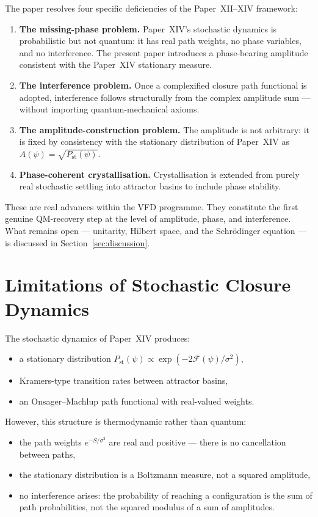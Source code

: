 \documentclass[12pt]{article}
\newcommand{\Fcal}{\mathcal{F}}
\begin{document}
The paper resolves four specific deficiencies of the Paper~XII--XIV framework:
\begin{enumerate}
    \item[(P1)] \textbf{The missing-phase problem.} Paper~XIV's stochastic dynamics is probabilistic but not quantum: it has real path weights, no phase variables, and no interference. The present paper introduces a phase-bearing amplitude consistent with the Paper~XIV stationary measure.
    \item[(P2)] \textbf{The interference problem.} Once a complexified closure path functional is adopted, interference follows structurally from the complex amplitude sum --- without importing quantum-mechanical axioms.
    \item[(P3)] \textbf{The amplitude-construction problem.} The amplitude is not arbitrary: it is fixed by consistency with the stationary distribution of Paper~XIV as $A(\psi) = \sqrt{P_{\mathrm{st}}(\psi)}$.
    \item[(P4)] \textbf{Phase-coherent crystallisation.} Crystallisation is extended from purely real stochastic settling into attractor basins to include phase stability.
\end{enumerate}
These are real advances within the VFD programme. They constitute the first genuine QM-recovery step at the level of amplitude, phase, and interference. What remains open --- unitarity, Hilbert space, and the Schr\"odinger equation --- is discussed in Section~\ref{sec:discussion}.

\section{Limitations of Stochastic Closure Dynamics}\label{sec:limitations_XIV}

The stochastic dynamics of Paper~XIV produces:
\begin{itemize}
    \item a stationary distribution $P_{\mathrm{st}}(\psi) \propto \exp(-2\Fcal(\psi)/\sigma^2)$,
    \item Kramers-type transition rates between attractor basins,
    \item an Onsager--Machlup path functional with real-valued weights.
\end{itemize}

However, this structure is thermodynamic rather than quantum:
\begin{itemize}
    \item the path weights $e^{-S/\sigma^2}$ are real and positive --- there is no cancellation between paths,
    \item the stationary distribution is a Boltzmann measure, not a squared amplitude,
    \item no interference arises: the probability of reaching a configuration is the sum of path probabilities, not the squared modulus of a sum of amplitudes.
\end{itemize}
\end{document}
